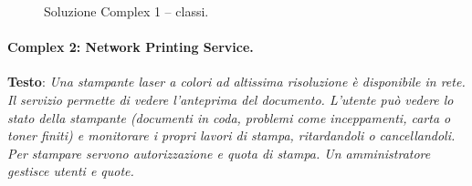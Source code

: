 \documentclass[12pt]{extarticle}
\begin{document}
\begin{figure}[H]
{}
    \caption{Soluzione Complex 1 -- classi.}
\end{figure}

\paragraph{Complex 2: Network Printing Service.}
\textbf{Testo}: \textit{Una stampante laser a colori ad altissima risoluzione è disponibile in rete. Il servizio permette di vedere l'anteprima del documento. L'utente può vedere lo stato della stampante (documenti in coda, problemi come inceppamenti, carta o toner finiti) e monitorare i propri lavori di stampa, ritardandoli o cancellandoli. Per stampare servono autorizzazione e quota di stampa. Un amministratore gestisce utenti e quote.}
\end{document}
